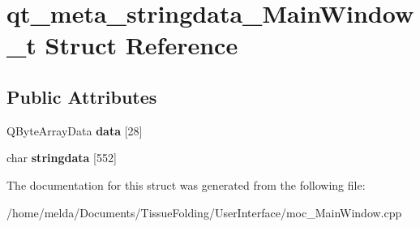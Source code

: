 \hypertarget{structqt__meta__stringdata__MainWindow__t}{}\section{qt\+\_\+meta\+\_\+stringdata\+\_\+\+Main\+Window\+\_\+t Struct Reference}
\label{structqt__meta__stringdata__MainWindow__t}
\subsection*{Public Attributes}
\begin{DoxyCompactItemize}
\item 
\hypertarget{structqt__meta__stringdata__MainWindow__t_a9c03f3d8180b5ac4f42de4a9d5710921}{}Q\+Byte\+Array\+Data {\bfseries data} \mbox{[}28\mbox{]}\label{structqt__meta__stringdata__MainWindow__t_a9c03f3d8180b5ac4f42de4a9d5710921}

\item 
\hypertarget{structqt__meta__stringdata__MainWindow__t_af23a621d1de5ef8db7c682f260f02aac}{}char {\bfseries stringdata} \mbox{[}552\mbox{]}\label{structqt__meta__stringdata__MainWindow__t_af23a621d1de5ef8db7c682f260f02aac}

\end{DoxyCompactItemize}


The documentation for this struct was generated from the following file\+:\begin{DoxyCompactItemize}
\item 
/home/melda/\+Documents/\+Tissue\+Folding/\+User\+Interface/moc\+\_\+\+Main\+Window.\+cpp\end{DoxyCompactItemize}
